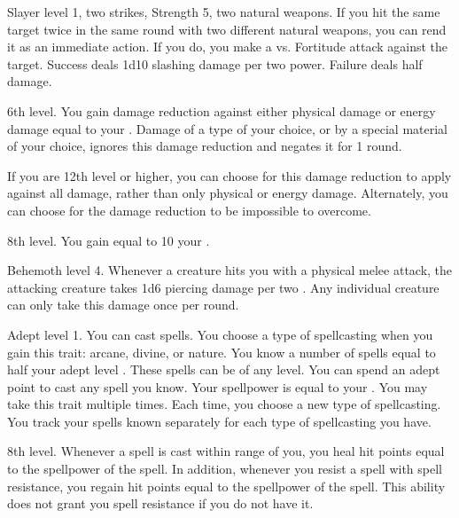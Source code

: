     \featpres Slayer level 1, two strikes, Strength 5, two natural weapons.
    \featben If you hit the same target twice in the same round with two different natural weapons, you can rend it as an immediate action.
    If you do, you make a  vs. Fortitude attack against the target.
    Success deals 1d10 slashing damage per two power.
    Failure deals half damage.

    \featpre 6th level.
    \featben You gain damage reduction against either physical damage or energy damage equal to your .
    Damage of a type of your choice, or by a special material of your choice, ignores this damage reduction and negates it for 1 round.

    If you are 12th level or higher, you can choose for this damage reduction to apply against all damage, rather than only physical or energy damage.
    Alternately, you can choose for the damage reduction to be impossible to overcome.

    \featpre 8th level.
    \featben You gain  equal to 10 \add your .

    \featpre Behemoth level 4.
    \featben Whenever a creature hits you with a physical melee attack, the attacking creature takes 1d6 piercing damage per two .
    Any individual creature can only take this damage once per round.

    \featpre Adept level 1.
    \featben You can cast spells.
    You choose a type of spellcasting when you gain this trait: arcane, divine, or nature.
    You know a number of spells equal to half your adept level .
    These spells can be of any level.
    You can spend an adept point to cast any spell you know.
    Your spellpower is equal to your .
     You may take this trait multiple times.
    Each time, you choose a new type of spellcasting.
    You track your spells known separately for each type of spellcasting you have.

    \featpre 8th level.
    \featben Whenever a spell is cast within \rngmed range of you, you heal hit points equal to the spellpower of the spell.
    In addition, whenever you resist a spell with spell resistance, you regain hit points equal to the spellpower of the spell.
    This ability does not grant you spell resistance if you do not have it.

